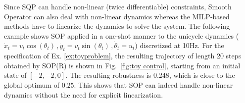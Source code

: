 \begin{exmp}
	\label{ex:nl_unicycle}
Since SQP can handle non-linear (twice differentiable) constraints, Smooth Operator can also deal with non-linear dynamics whereas the MILP-based methods have to linearize the dynamics to solve the system. 
The following example shows SOP applied in a one-shot manner to the unicycle dynamics ($\dot{x}_t=v_t \cos (\theta_t)\, ,\dot{y}_t=v_t \sin (\theta_t)\, ,\dot{\theta}_t= u_t$) discretized at 10Hz.
For the specification of Ex. \ref{ex:toyproblem}, the resulting trajectory of length 20 steps obtained by SOP(R) is shown in Fig.~\ref{fig:toy control}, starting from an initial state of $[-2,-2,0]$. The resulting robustness is $0.248$, which is close to the global optimum of $0.25$. This shows that SOP can indeed handle non-linear dynamics without the need for explicit linearization.
\end{exmp}